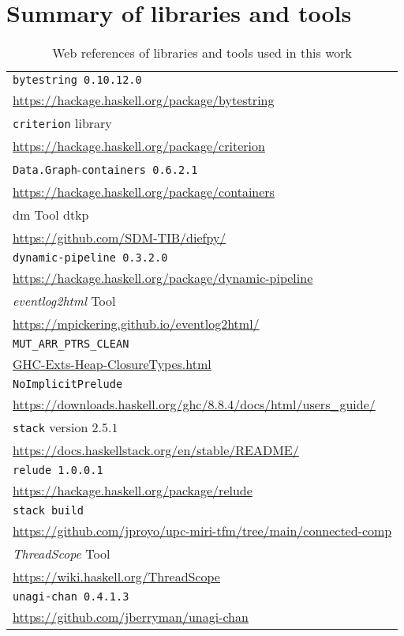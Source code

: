 \newpage
\appendix

\section{Summary of libraries and tools}

\begin{table}[H]
\centering
\begin{tabular}{|l|}
\hline
\texttt{bytestring 0.10.12.0}\\ 
\url{https://hackage.haskell.org/package/bytestring}\\\hline
\texttt{criterion} library\\
\url{https://hackage.haskell.org/package/criterion}\\\hline
\texttt{Data.Graph}-\texttt{containers 0.6.2.1}\\ \url{https://hackage.haskell.org/package/containers}\\\hline
\acrfull{dm} Tool \acrshort{dtkp}\\ 
\url{https://github.com/SDM-TIB/diefpy/}\\\hline
\texttt{dynamic-pipeline 0.3.2.0}\\ 
\url{https://hackage.haskell.org/package/dynamic-pipeline}\\\hline
\textit{eventlog2html} Tool\\
\url{https://mpickering.github.io/eventlog2html/}\\\hline
\texttt{MUT_ARR_PTRS_CLEAN}\\
\href{https://downloads.haskell.org/~ghc/8.10.4/docs/html/libraries/ghc-heap-8.10.4/GHC-Exts-Heap-ClosureTypes.html}{GHC-Exts-Heap-ClosureTypes.html}\\\hline
\texttt{NoImplicitPrelude}\\ 
\url{https://downloads.haskell.org/ghc/8.8.4/docs/html/users_guide/}\\\hline
\texttt{stack} version $2.5.1$\\ 
\url{https://docs.haskellstack.org/en/stable/README/}\\\hline
\texttt{relude 1.0.0.1}\\ 
\url{https://hackage.haskell.org/package/relude}\\\hline
\texttt{stack build}\\ 
\url{https://github.com/jproyo/upc-miri-tfm/tree/main/connected-comp}\\\hline
\textit{ThreadScope} Tool\\
\url{https://wiki.haskell.org/ThreadScope}\\\hline
\texttt{unagi-chan 0.4.1.3}\\
\url{https://github.com/jberryman/unagi-chan}\\\hline
\end{tabular}
\caption{Web references of libraries and tools used in this work} \label{tab:libraries}
\end{table}

